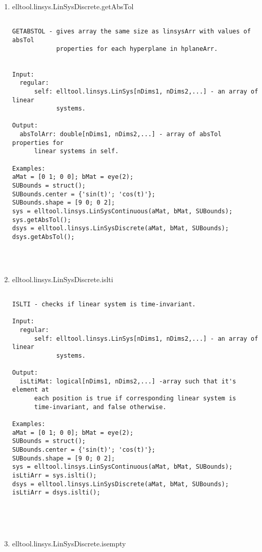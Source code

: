 \begin{enumerate}
\begin{lstlisting}
\end{lstlisting}
\fontfamily{\familydefault}
\selectfont
\item {elltool.linsys.LinSysDiscrete.getAbsTol}
\selectfont
\begin{lstlisting}

GETABSTOL - gives array the same size as linsysArr with values of absTol
            properties for each hyperplane in hplaneArr.


Input:
  regular:
      self: elltool.linsys.LinSys[nDims1, nDims2,...] - an array of linear
            systems.

Output:
  absTolArr: double[nDims1, nDims2,...] - array of absTol properties for
      linear systems in self.

Examples:
aMat = [0 1; 0 0]; bMat = eye(2);
SUBounds = struct();
SUBounds.center = {'sin(t)'; 'cos(t)'};
SUBounds.shape = [9 0; 0 2];
sys = elltool.linsys.LinSysContinuous(aMat, bMat, SUBounds);
sys.getAbsTol();
dsys = elltool.linsys.LinSysDiscrete(aMat, bMat, SUBounds);
dsys.getAbsTol();




\end{lstlisting}
\fontfamily{\familydefault}
\selectfont
\item {elltool.linsys.LinSysDiscrete.islti}
\selectfont
\begin{lstlisting}

ISLTI - checks if linear system is time-invariant.

Input:
  regular:
      self: elltool.linsys.LinSys[nDims1, nDims2,...] - an array of linear
            systems.

Output:
  isLtiMat: logical[nDims1, nDims2,...] -array such that it's element at
      each position is true if corresponding linear system is
      time-invariant, and false otherwise.

Examples:
aMat = [0 1; 0 0]; bMat = eye(2);
SUBounds = struct();
SUBounds.center = {'sin(t)'; 'cos(t)'};
SUBounds.shape = [9 0; 0 2];
sys = elltool.linsys.LinSysContinuous(aMat, bMat, SUBounds);
isLtiArr = sys.islti();
dsys = elltool.linsys.LinSysDiscrete(aMat, bMat, SUBounds);
isLtiArr = dsys.islti();





\end{lstlisting}
\fontfamily{\familydefault}
\selectfont
\item {elltool.linsys.LinSysDiscrete.isempty}
\selectfont
\begin{lstlisting}


\end{lstlisting}
\end{enumerate}
